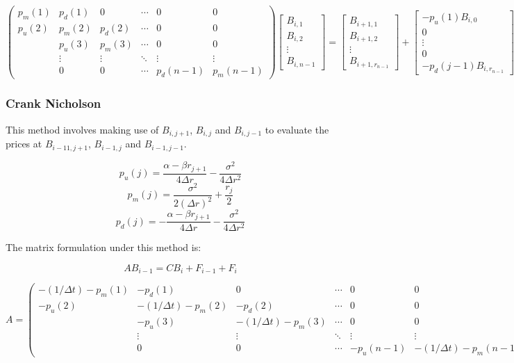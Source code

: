 \documentclass[12pt,a4paper]{article}
\begin{document}
$$\left( \begin{array}{cccccc}
p_m(1) & p_d(1) & 0 & \cdots  & 0 & 0\\
p_u(2) & p_m(2) & p_d(2) &\cdots & 0 & 0 \\
& p_u(3) & p_m(3) & \cdots & 0 & 0  \\
& \vdots &\vdots & \ddots & \vdots & \vdots \\ 
& 0 & 0 & \cdots & p_d(n-1) & p_m(n-1) \end{array} \right)
%
\begin{bmatrix}
B_{i,1} \\
B_{i,2} \\
\vdots \\
B_{i,n-1}
\end{bmatrix}
=
\begin{bmatrix}
B_{i+1,1} \\
B_{i+1,2} \\
\vdots \\
B_{i+1,r_{n-1}}
\end{bmatrix}
+
\begin{bmatrix}
-p_u(1)B_{i,0} \\
0 \\
\vdots \\
0 \\
-p_d(j-1)B_{i, r_{n-1}}
\end{bmatrix}
$$


\subsubsection{Crank Nicholson}

This method involves making use of $B_{i,j+1}$, $B_{i,j}$ and $B_{i,j-1}$ to evaluate the prices at $B_{i-11,j+1}$, $B_{i-1,j}$ and $B_{i-1,j-1}$. 

$$p_u(j)=\frac{\alpha-\beta r_{j+1}}{4\Delta r} - \frac{\sigma^2}{4\Delta r^2}$$
$$p_m(j)= \frac{\sigma^2}{2 (\Delta r)^2}+\frac{r_{j}}{2}$$
$$p_d(j)=-\frac{\alpha-\beta r_{j+1}}{4\Delta r} - \frac{\sigma^2}{4\Delta r^2}$$

The matrix formulation under this method is:

$$AB_{i-1}=CB_{i}+F_{i-1}+F_{i}$$


$$A= \left( \begin{array}{cccccc}
-(1/\Delta t)-p_m(1) & -p_d(1) & 0 & \cdots  & 0 & 0\\
-p_u(2) & -(1/\Delta t)-p_m(2) & -p_d(2) &\cdots & 0 & 0 \\
& -p_u(3) & -(1/\Delta t)-p_m(3) & \cdots & 0 & 0  \\
& \vdots &\vdots & \ddots & \vdots & \vdots \\ 
& 0 & 0 & \cdots & -p_u(n-1) & -(1/\Delta t)-p_m(n-1) \end{array} \right)
$$
\end{document}
